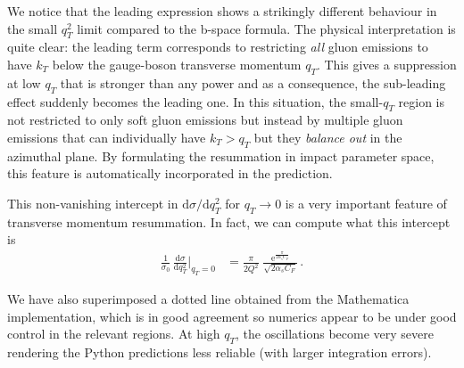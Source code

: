 \documentclass[11pt]{article}
\begin{document}
We notice that the leading expression shows a strikingly different behaviour in the small \(q_T^2\) limit compared to the b-space formula.
The physical interpretation is quite clear: the leading term corresponds to restricting \emph{all} gluon emissions to have \(k_T\) below the gauge-boson transverse momentum \(q_T\).
This gives a suppression at low \(q_T\) that is stronger than any power and as a consequence, the sub-leading effect suddenly becomes the leading one.
In this situation, the small-\(q_T\) region is not restricted to only soft gluon emissions but instead by multiple gluon emissions that can individually have \(k_T > q_T\) but they \emph{balance out} in the azimuthal plane.
By formulating the resummation in impact parameter space, this feature is automatically incorporated in the prediction.

This non-vanishing intercept in \(\mathrm{d}\sigma/\mathrm{d}q_T^2\) for \(q_T\to0\) is a very important feature of transverse momentum resummation.
In fact, we can compute what this intercept is
\begin{align}
  \frac{1}{\sigma_0}\,\frac{\mathrm{d}\sigma}{\mathrm{d}q_T^2} \biggr\rvert_{q_T=0}
  &=
  \frac{\pi}{2 Q^2}\;\frac{\mathrm{e}^{\frac{\pi}{2\alpha_s C_F}}}{\sqrt{2\alpha_s C_F}}
  \,.
\end{align}

We have also superimposed a dotted line obtained from the Mathematica implementation, which is in good agreement so numerics appear to be under good control in the relevant regions.
At high \(q_T\), the oscillations become very severe rendering the Python predictions less reliable (with larger integration errors).
\end{document}
